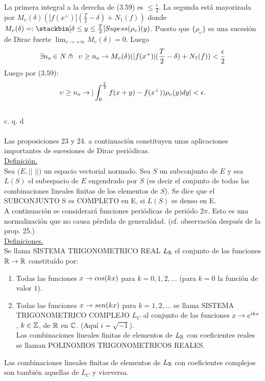 La primera integral a la derecha de (3.59) es $\leq \frac{\epsilon}{2}$. La segunda está mayorizada por $M_\upsilon (\delta) (|f(x^+)|(\frac{T}{2}-\delta)+N_1 (f))$ donde $M_\upsilon (\delta)=:
\stackbin[\delta \leq y \leq \frac{T}{2}]{}{Sup}ess(\rho_\upsilon)(y)$. Puesto que $\lbrace \rho_\upsilon \rbrace$ es una sucesión de Dirac fuerte $\lim_{\upsilon \to +\infty}M_\upsilon (\delta)=0$. Luego
$$
\exists n_o \in N \pitchfork \phantom{s} \upsilon \geq n_o \rightarrow M_\upsilon (\delta)(|f(x^+)|(\frac{T}{2}-\delta)+N_1 (f))<\frac{\epsilon}{2}
$$
Luego por (3.59):
$$
\upsilon \geq n_o \rightarrow |\int_{0}^{\frac{T}{2}}f(x+y)-f(x^+))\rho_\upsilon (y)dy| < \epsilon.
$$
 \\
 \phantom{sssssssssssssssssssssssssssssssssss sasdasdasdasdadadssada} c. q. d \\ \\
 Las proposiciones 23 y 24. a continuación constituyen unas aplicaciones importantes de sucesiones de Dirac periódicas. \\
 \underline{Definición.}\\
Sea $(E,||$ $||)$ un espacio vectorial normado. Sea $S$ un subconjunto de $E$ y sea $L(S)$ el subespacio de $E$ engendrado por $S$ (es decir el conjunto de todas las combinaciones lineales finitas de los elementos de $S$). Se dice que el SUBCONJUNTO S es COMPLETO en E, si $L(S)$ es denso en E.\\
A continuación se considerará funciones periódicas de periódo $2\pi$. Esto es una normalización que no causa pérdida de generalidad. (cf. observación después de la prop. 25.) \\
\underline{Definiciones.}\\
Se llama SISTEMA TRIGONOMETRICO REAL $L_{\mathbb{R}}$ el conjunto de las funciones $\mathbb{R} \rightarrow \mathbb{R}$ constituído por:
\begin{enumerate}[1)]
\item Todas las funciones $x\rightarrow cos (kx)$ para $k=0,1,2,\ldots$ (para $k=0$ la función de valor $1$).
\item Todas las funciones $x \rightarrow sen(kx)$ para $k=1,2,\ldots$ se llama SISTEMA TRIGONOMETRICO COMPLEJO $L_C$ al conjunto de las funciones $x \rightarrow e^{ikx}$, $k \in \mathbb{Z}$, de $\mathbb{R}$ en $\mathbb{C}$. (Aquí $i=\sqrt{-1}$). \\
Las combinaciones lineales finitas de elementos de $L_{\mathbb{R}}$ con coeficientes reales se llaman POLINOMIOS TRIGONOMETRICOS REALES. 
\end{enumerate}
Las combinaciones lineales finitas de elementos de $L_{\mathbb{R}}$ con coeficientes complejos son también aquellas de $L_C$ y viceversa. \\
